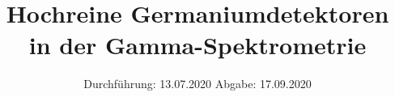 

\subject{V 18}
\title{Hochreine Germaniumdetektoren in der Gamma-Spektrometrie}
\date{%
  Durchführung: 13.07.2020
  \hspace{3em}
  Abgabe: 17.09.2020
}



\maketitle
\thispagestyle{empty}
\tableofcontents
\newpage






\printbibliography{}


